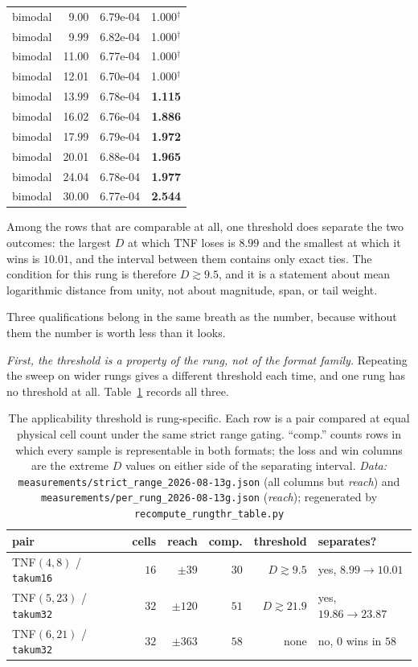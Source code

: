 \documentclass[11pt]{article}
\theoremstyle{definition}
\begin{document}
\begin{table}[htbp]
\begin{tabular}{lrrr}
bimodal & 9.00 & 6.79e-04 & 1.000$^{\dagger}$ \\
bimodal & 9.99 & 6.82e-04 & 1.000$^{\dagger}$ \\
bimodal & 11.00 & 6.77e-04 & 1.000$^{\dagger}$ \\
bimodal & 12.01 & 6.70e-04 & 1.000$^{\dagger}$ \\
bimodal & 13.99 & 6.78e-04 & \textbf{1.115} \\
bimodal & 16.02 & 6.76e-04 & \textbf{1.886} \\
bimodal & 17.99 & 6.79e-04 & \textbf{1.972} \\
bimodal & 20.01 & 6.88e-04 & \textbf{1.965} \\
bimodal & 24.04 & 6.78e-04 & \textbf{1.977} \\
bimodal & 30.00 & 6.77e-04 & \textbf{2.544} \\
\hline
\end{tabular}
\end{table}

Among the rows that are comparable at all, one threshold does separate the two
outcomes: the largest $D$ at which TNF loses is $8.99$ and the smallest at which
it wins is $10.01$, and the interval between them contains only exact ties. The
condition for this rung is therefore $D \gtrsim 9.5$, and it is a statement about
mean logarithmic distance from unity, not about magnitude, span, or tail weight.

Three qualifications belong in the same breath as the number, because without
them the number is worth less than it looks.

\emph{First, the threshold is a property of the rung, not of the format family.}
Repeating the sweep on wider rungs gives a different threshold each time, and one
rung has no threshold at all. Table~\ref{tab:rungthr} records all three.

\begin{table}[htbp]\centering
\caption{The applicability threshold is rung-specific. Each row is a pair
compared at equal physical cell count under the same strict range gating. ``comp.''
counts rows in which every sample is representable in both formats; the loss and
win columns are the extreme $D$ values on either side of the separating interval. \emph{Data:} \texttt{measurements/strict\_range\_2026-08-13g.json} (all columns but \emph{reach}) and \texttt{measurements/per\_rung\_2026-08-13g.json} (\emph{reach}); regenerated by \texttt{recompute\_rungthr\_table.py}}
\label{tab:rungthr}
\begin{tabular}{lrrrrl}
\hline
pair & cells & reach & comp. & threshold & separates? \\
\hline
TNF$(4,8)$ / \texttt{takum16} & $16$ & $\pm 39$ & $30$ & $D \gtrsim 9.5$ & yes, $8.99 \to 10.01$ \\
TNF$(5,23)$ / \texttt{takum32} & $32$ & $\pm 120$ & $51$ & $D \gtrsim 21.9$ & yes, $19.86 \to 23.87$ \\
TNF$(6,21)$ / \texttt{takum32} & $32$ & $\pm 363$ & $58$ & none & no, $0$ wins in $58$ \\
\hline
\end{tabular}
\end{table}
\end{document}
